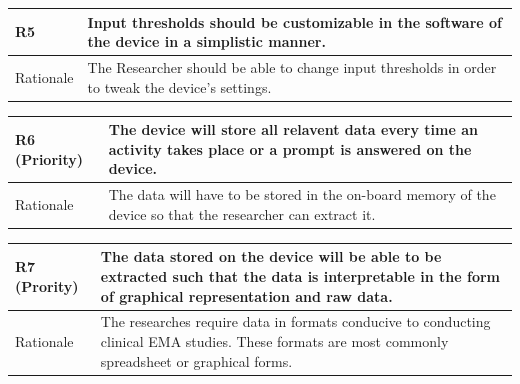 \documentclass[12pt]{article}
\begin{document}
\hspace{0.5em}
\begin{center}
\begin{tabular}{|l|p{14cm}|}
 \hline
 R5 \label{R5} &Input thresholds should be customizable in the software of the device in a simplistic manner.\\ [0.5ex]
 \hline
 Rationale & The Researcher should be able to change input thresholds in order to tweak the device's settings.\\ 
 \hline
\end{tabular}
\end{center}
\hspace{0.5em}
\begin{center}
\begin{tabular}{|l|p{14cm}|}
 \hline
 R6 \label{R6} (Priority) &The device will store all relavent data every time an activity takes place or a prompt is answered on the device.\\ [0.5ex]
 \hline
 Rationale & The data will have to be stored in the on-board memory of the device so that the researcher can extract it.\\ 
 \hline
\end{tabular}
\end{center}
\hspace{0.5em}
\begin{center}
\begin{tabular}{|l|p{14cm}|}
 \hline
 R7 \label{R7} (Prority) &The data stored on the device will be able to be extracted such that the data is interpretable in the form of graphical representation and raw data.\\[0.5ex]
 \hline
 Rationale & The researches require data in formats conducive to conducting clinical EMA studies. These formats are most commonly spreadsheet or graphical forms.\\ 
 \hline
\end{tabular}
\end{center}
\end{document}
